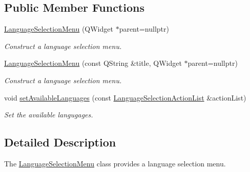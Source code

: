 \subsection*{Public Member Functions}
\begin{DoxyCompactItemize}
\item 
\hyperlink{class_mdt_1_1_translation_1_1_language_selection_menu_abdddd4c8b340d177883383de114ff63f}{Language\+Selection\+Menu} (Q\+Widget $\ast$parent=nullptr)\hypertarget{class_mdt_1_1_translation_1_1_language_selection_menu_abdddd4c8b340d177883383de114ff63f}{}\label{class_mdt_1_1_translation_1_1_language_selection_menu_abdddd4c8b340d177883383de114ff63f}

\begin{DoxyCompactList}\small\item\em Construct a language selection menu. \end{DoxyCompactList}\item 
\hyperlink{class_mdt_1_1_translation_1_1_language_selection_menu_a46f4e984342db34ffbd089f58a79f758}{Language\+Selection\+Menu} (const Q\+String \&title, Q\+Widget $\ast$parent=nullptr)\hypertarget{class_mdt_1_1_translation_1_1_language_selection_menu_a46f4e984342db34ffbd089f58a79f758}{}\label{class_mdt_1_1_translation_1_1_language_selection_menu_a46f4e984342db34ffbd089f58a79f758}

\begin{DoxyCompactList}\small\item\em Construct a language selection menu. \end{DoxyCompactList}\item 
void \hyperlink{class_mdt_1_1_translation_1_1_language_selection_menu_a9264c6e07964df23fcdb6a1157d52df4}{set\+Available\+Languages} (const \hyperlink{class_mdt_1_1_translation_1_1_language_selection_action_list}{Language\+Selection\+Action\+List} \&action\+List)\hypertarget{class_mdt_1_1_translation_1_1_language_selection_menu_a9264c6e07964df23fcdb6a1157d52df4}{}\label{class_mdt_1_1_translation_1_1_language_selection_menu_a9264c6e07964df23fcdb6a1157d52df4}

\begin{DoxyCompactList}\small\item\em Set the available langugages. \end{DoxyCompactList}\end{DoxyCompactItemize}


\subsection{Detailed Description}
The \hyperlink{class_mdt_1_1_translation_1_1_language_selection_menu}{Language\+Selection\+Menu} class provides a language selection menu. 


